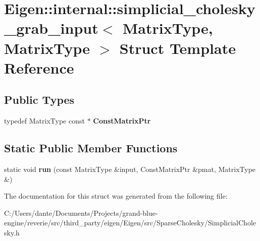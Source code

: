 \hypertarget{struct_eigen_1_1internal_1_1simplicial__cholesky__grab__input_3_01_matrix_type_00_01_matrix_type_01_4}{}\section{Eigen\+::internal\+::simplicial\+\_\+cholesky\+\_\+grab\+\_\+input$<$ Matrix\+Type, Matrix\+Type $>$ Struct Template Reference}
\label{struct_eigen_1_1internal_1_1simplicial__cholesky__grab__input_3_01_matrix_type_00_01_matrix_type_01_4}
\subsection*{Public Types}
\begin{DoxyCompactItemize}
\item 
\mbox{\label{struct_eigen_1_1internal_1_1simplicial__cholesky__grab__input_3_01_matrix_type_00_01_matrix_type_01_4_a7cd687af3b3232d252dc00c646ed6f67}} 
typedef Matrix\+Type const  $\ast$ {\bfseries Const\+Matrix\+Ptr}
\end{DoxyCompactItemize}
\subsection*{Static Public Member Functions}
\begin{DoxyCompactItemize}
\item 
\mbox{\label{struct_eigen_1_1internal_1_1simplicial__cholesky__grab__input_3_01_matrix_type_00_01_matrix_type_01_4_a56ae7a93a8b10ca64e27abf1cdaa4542}} 
static void {\bfseries run} (const Matrix\+Type \&input, Const\+Matrix\+Ptr \&pmat, Matrix\+Type \&)
\end{DoxyCompactItemize}


The documentation for this struct was generated from the following file\+:\begin{DoxyCompactItemize}
\item 
C\+:/\+Users/dante/\+Documents/\+Projects/grand-\/blue-\/engine/reverie/src/third\+\_\+party/eigen/\+Eigen/src/\+Sparse\+Cholesky/Simplicial\+Cholesky.\+h\end{DoxyCompactItemize}
